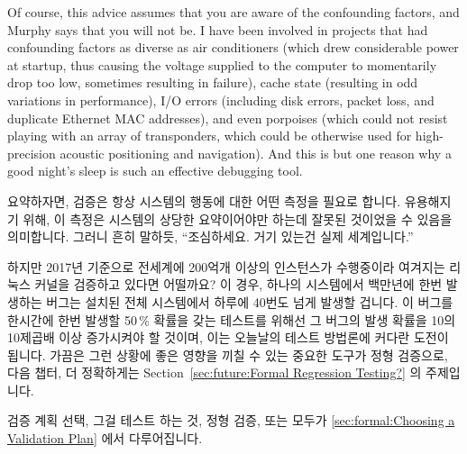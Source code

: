 Of course, this advice assumes that you are aware of the confounding
factors, and Murphy says that you will not be.
I have been involved in projects that had confounding factors as diverse
as air conditioners (which drew considerable power at startup, thus
causing the voltage supplied to the computer to momentarily drop too
low, sometimes resulting in failure), cache state (resulting in odd
variations in performance), I/O errors (including disk errors, packet
loss, and duplicate Ethernet MAC addresses), and even porpoises (which
could not resist playing with an array of transponders, which could be
otherwise used for high-precision acoustic positioning and navigation).
And this is but one reason why a good night's sleep is such an effective
debugging tool.

\fi

요약하자면, 검증은 항상 시스템의 행동에 대한 어떤 측정을 필요로 합니다.
유용해지기 위해, 이 측정은 시스템의 상당한 요약이어야만 하는데 잘못된 것이었을
수 있음을 의미합니다.
그러니 흔히 말하듯, ``조심하세요.  거기 있는건 실제 세계입니다.''

하지만 2017년 기준으로 전세계에 200억개 이상의 인스턴스가 수행중이라 여겨지는
리눅스 커널을 검증하고 있다면 어떨까요?
이 경우, 하나의 시스템에서 백만년에 한번 발생하는 버그는 설치된 전체 시스템에서
하루에 40번도 넘게 발생할 겁니다.
이 버그를 한시간에 한번 발생할 50\,\% 확률을 갖는 테스트를 위해선 그 버그의
발생 확률을 10의 10제곱배 이상 증가시켜야 할 것이며, 이는 오늘날의 테스트
방법론에 커다란 도전이 됩니다.
가끔은 그런 상황에 좋은 영향을 끼칠 수 있는 중요한 도구가 정형 검증으로, 다음
챕터, 더 정확하게는
Section~\ref{sec:future:Formal Regression Testing?} 의 주제입니다.

검증 계획 선택, 그걸 테스트 하는 것, 정형 검증, 또는 모두가
\cref{sec:formal:Choosing a Validation Plan} 에서 다루어집니다.

